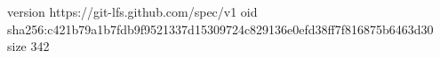 version https://git-lfs.github.com/spec/v1
oid sha256:c421b79a1b7fdb9f9521337d15309724c829136e0efd38ff7f816875b6463d30
size 342

